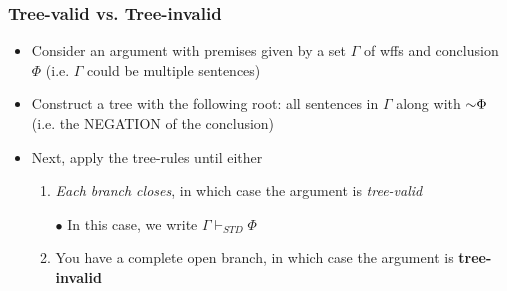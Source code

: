 \begin{frame}
\frametitle{Tree-valid vs. Tree-invalid}

\begin{itemize}[<+->]

\item Consider an argument with premises given by a set $\Gamma$ of wffs and conclusion $\Phi $ (i.e. $\Gamma$ could be multiple sentences)

\item Construct a tree with the following root: all sentences in $\Gamma$ along with $\enot \Phi $ (i.e. the NEGATION of the conclusion)

\item Next, apply the tree-rules until either

\bigskip

\begin{enumerate}[1.)]

\item \emph{Each branch closes}, in which case the argument is \emph{tree-valid}

\medskip $\bullet$ In this case, we write $\Gamma \vdash_{STD} \Phi $

\bigskip

\item You have \textcolor{OGlyallpink}{a complete open branch}, in which case the argument is \textcolor{OGlyallpink}{\textbf{tree-invalid}}


\end{enumerate}


\end{itemize}
\end{frame}

